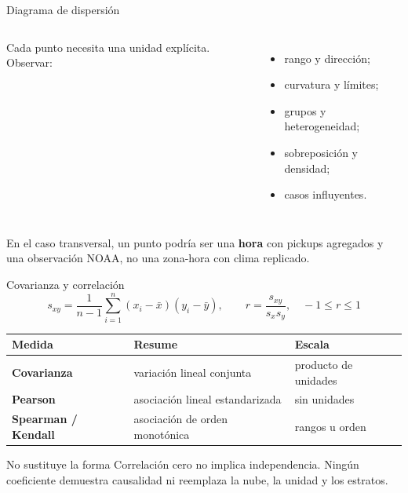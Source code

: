 \documentclass[aspectratio=169,11pt]{beamer}
\begin{document}
\begin{frame}{Diagrama de dispersión}
  \small
  \begin{columns}[T]
      Cada punto necesita una unidad explícita. Observar:
      \begin{itemize}
        \item rango y dirección;
        \item curvatura y límites;
        \item grupos y heterogeneidad;
        \item sobreposición y densidad;
        \item casos influyentes.
      \end{itemize}
      \centering
  \end{columns}
  \vfill
  En el caso transversal, un punto podría ser una \textbf{hora} con pickups agregados y una observación NOAA, no una zona-hora con clima replicado.
\end{frame}

\begin{frame}{Covarianza y correlación}
  \footnotesize
  \[
    s_{xy}=\frac{1}{n-1}\sum_{i=1}^{n}(x_i-\bar{x})(y_i-\bar{y}),\qquad
    r=\frac{s_{xy}}{s_xs_y},\quad -1\leq r\leq 1
  \]
  \begin{tabularx}{\textwidth}{>{\bfseries}p{} X p{}}
    \toprule
    Medida & Resume & Escala \\
    \midrule
    Covarianza & variación lineal conjunta & producto de unidades \\
    Pearson & asociación lineal estandarizada & sin unidades \\
    Spearman / Kendall & asociación de orden monotónica & rangos u orden \\
    \bottomrule
  \end{tabularx}
  \vspace{.6em}
  \begin{alertblock}{No sustituye la forma}
    Correlación cero no implica independencia. Ningún coeficiente demuestra causalidad ni reemplaza la nube, la unidad y los estratos.
  \end{alertblock}
\end{frame}
\end{document}

